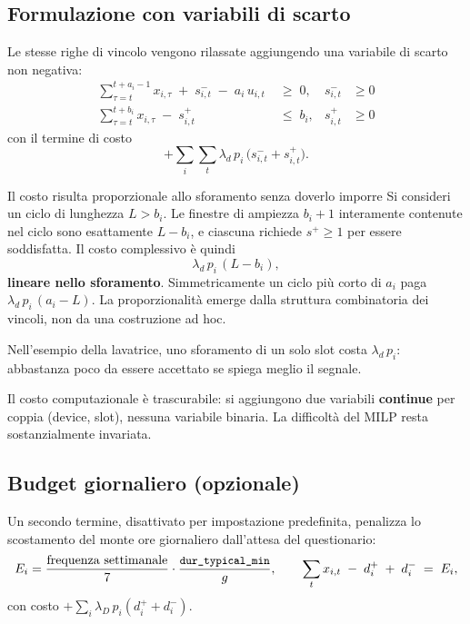 \subsection*{Formulazione con variabili di scarto}

Le stesse righe di vincolo vengono rilassate aggiungendo una variabile di scarto non negativa:
\begin{align}
  \sum_{\tau=t}^{t+a_i-1} x_{i,\tau} \;+\; s^{-}_{i,t} \;-\; a_i \, u_{i,t} &\;\ge\; 0,
  & s^{-}_{i,t} &\ge 0 \label{eq:soft-min}\\
  \sum_{\tau=t}^{t+b_i} x_{i,\tau} \;-\; s^{+}_{i,t} &\;\le\; b_i,
  & s^{+}_{i,t} &\ge 0 \label{eq:soft-max}
\end{align}
con il termine di costo
\begin{equation}
  + \sum_{i} \sum_{t} \lambda_d \, p_i \, \bigl( s^{-}_{i,t} + s^{+}_{i,t} \bigr).
\end{equation}

\begin{notebox}{Il costo risulta proporzionale allo sforamento senza doverlo imporre}
Si consideri un ciclo di lunghezza $L > b_i$. Le finestre di ampiezza $b_i+1$ interamente
contenute nel ciclo sono esattamente $L - b_i$, e ciascuna richiede $s^{+} \ge 1$ per essere
soddisfatta. Il costo complessivo è quindi
\begin{equation*}
  \lambda_d \, p_i \, (L - b_i),
\end{equation*}
\textbf{lineare nello sforamento}. Simmetricamente un ciclo più corto di $a_i$ paga
$\lambda_d \, p_i \, (a_i - L)$. La proporzionalità emerge dalla struttura combinatoria dei
vincoli, non da una costruzione ad hoc.

Nell'esempio della lavatrice, uno sforamento di un solo slot costa $\lambda_d \, p_i$: abbastanza
poco da essere accettato se spiega meglio il segnale.
\end{notebox}

Il costo computazionale è trascurabile: si aggiungono due variabili \textbf{continue} per coppia
(device, slot), nessuna variabile binaria. La difficoltà del MILP resta sostanzialmente invariata.

\subsection*{Budget giornaliero (opzionale)}

Un secondo termine, disattivato per impostazione predefinita, penalizza lo scostamento del monte
ore giornaliero dall'attesa del questionario:
\begin{equation}
  E_i = \frac{\text{frequenza settimanale}}{7} \cdot \frac{\texttt{\small dur\_typical\_min}}{g},
  \qquad
  \sum_{t} x_{i,t} \;-\; d^{+}_i \;+\; d^{-}_i \;=\; E_i ,
\end{equation}
con costo $+\sum_i \lambda_D \, p_i (d^{+}_i + d^{-}_i)$.

